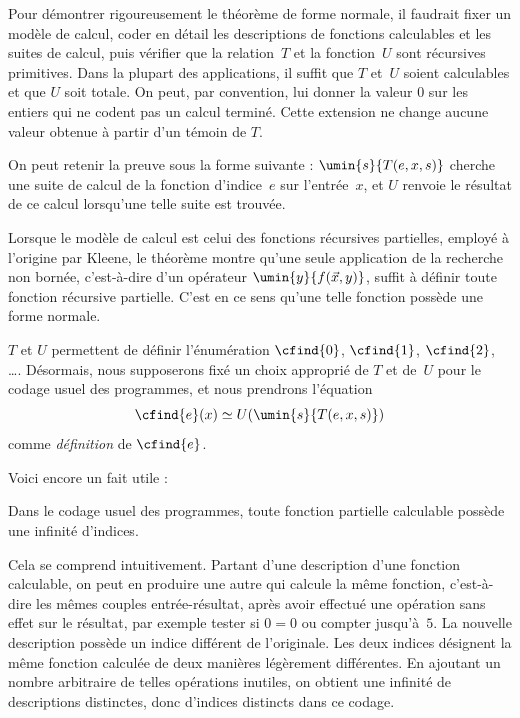 \documentclass[../../../include/open-logic-section]{subfiles}
\begin{document}
\begin{explain}
Pour démontrer rigoureusement le théorème de forme
normale, il faudrait fixer un modèle de calcul,
coder en détail les descriptions de fonctions
calculables et les suites de calcul, puis vérifier
que la relation~$T$ et la fonction~$U$ sont
récursives primitives. Dans la plupart des
applications, il suffit que $T$ et~$U$ soient
calculables et que $U$ soit totale. On peut, par convention, lui donner la valeur $0$ sur les entiers qui ne codent pas un calcul terminé. Cette extension ne change aucune valeur obtenue à partir d'un témoin de $T$.

On peut retenir la preuve sous la forme suivante :
$\umin{s}{T(e, x, s)}$ cherche une suite de calcul
de la fonction d'indice~$e$ sur l'entrée~$x$,
et $U$ renvoie le résultat de ce calcul lorsqu'une
telle suite est trouvée.
\end{explain}

Lorsque le modèle de calcul est celui des fonctions
récursives partielles, employé à l'origine par
Kleene, le théorème montre qu'une seule application
de la recherche non bornée, c'est-à-dire d'un
opérateur $\umin{y}{f(\vec x,y)}$, suffit à définir
toute fonction récursive partielle. C'est en ce sens
qu'une telle fonction possède une forme normale.

$T$ et $U$ permettent de définir l'énumération
$\cfind{0}$, $\cfind{1}$, $\cfind{2}$, \dots.
Désormais, nous supposerons fixé un choix approprié
de $T$ et de~$U$ pour le codage usuel des programmes, et nous prendrons l'équation
\[
\cfind{e}(x) \simeq U(\umin{s}{T(e,x,s)})
\]
comme \emph{définition} de $\cfind{e}$.

Voici encore un fait utile :

\begin{thm}
Dans le codage usuel des programmes, toute fonction partielle calculable possède une
infinité d'indices.
\end{thm}

Cela se comprend intuitivement. Partant d'une
description d'une fonction calculable, on peut
en produire une autre qui calcule la même
fonction, c'est-à-dire les mêmes couples
entrée-résultat, après avoir effectué une
opération sans effet sur le résultat, par exemple
tester si $0=0$ ou compter jusqu'à~$5$.
La nouvelle description possède un indice
différent de l'originale. Les deux indices
désignent la même fonction calculée de deux
manières légèrement différentes. En ajoutant un nombre arbitraire de telles opérations inutiles, on obtient une infinité de descriptions distinctes, donc d'indices distincts dans ce codage.
\end{document}
